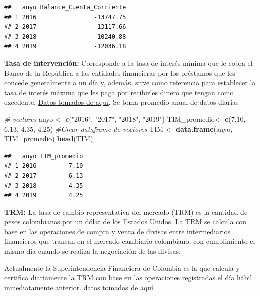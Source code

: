 \documentclass[
  11pt,
  a4paper,
]{book}
\newenvironment{Shaded}{\begin{snugshade}}{\end{snugshade}}
\newcommand{\CommentTok}[1]{\textcolor[rgb]{0.56,0.35,0.01}{\textit{#1}}}
\newcommand{\FloatTok}[1]{\textcolor[rgb]{0.00,0.00,0.81}{#1}}
\newcommand{\KeywordTok}[1]{\textcolor[rgb]{0.13,0.29,0.53}{\textbf{#1}}}
\newcommand{\NormalTok}[1]{#1}
\newcommand{\StringTok}[1]{\textcolor[rgb]{0.31,0.60,0.02}{#1}}
\begin{document}
\begin{verbatim}
##   anyo Balance_Cuenta_Corriente
## 1 2016                -13747.75
## 2 2017                -13117.66
## 3 2018                -10240.88
## 4 2019                -12036.18
\end{verbatim}

\textbf{Tasa de intervención:} Corresponde a la tasa de interés mínima
que le cobra el Banco de la República a las entidades financieras por
los préstamos que les concede generalmente a un día y, además, sirve
como referencia para establecer la tasa de interés máxima que les paga
por recibirles dinero que tengan como excedente.
\href{https://www.banrep.gov.co/es/estadisticas/tasas-interes-politica-monetaria}{Datos
tomados de aquí}. Se toma promedio anual de datos diarias

\begin{Shaded}
\begin{Highlighting}[]
\CommentTok{# vectores }
\NormalTok{anyo <-}\StringTok{ }\KeywordTok{c}\NormalTok{(}\StringTok{"2016"}\NormalTok{, }\StringTok{"2017"}\NormalTok{, }\StringTok{"2018"}\NormalTok{, }\StringTok{"2019"}\NormalTok{)}
\NormalTok{TIM_promedio<-}\StringTok{ }\KeywordTok{c}\NormalTok{(}\FloatTok{7.10}\NormalTok{, }\FloatTok{6.13}\NormalTok{, }\FloatTok{4.35}\NormalTok{, }\FloatTok{4.25}\NormalTok{)}
\CommentTok{#Crear dataframe de vectores}
\NormalTok{TIM <-}\StringTok{ }\KeywordTok{data.frame}\NormalTok{(anyo, TIM_promedio)}
\KeywordTok{head}\NormalTok{(TIM)}
\end{Highlighting}
\end{Shaded}

\begin{verbatim}
##   anyo TIM_promedio
## 1 2016         7.10
## 2 2017         6.13
## 3 2018         4.35
## 4 2019         4.25
\end{verbatim}

\textbf{TRM:} La tasa de cambio representativa del mercado (TRM) es la
cantidad de pesos colombianos por un dólar de los Estados Unidos. La TRM
se calcula con base en las operaciones de compra y venta de divisas
entre intermediarios financieros que transan en el mercado cambiario
colombiano, con cumplimiento el mismo día cuando se realiza la
negociación de las divisas.

Actualmente la Superintendencia Financiera de Colombia es la que calcula
y certifica diariamente la TRM con base en las operaciones registradas
el día hábil inmediatamente anterior.
\href{https://www.dolar-colombia.com/historico}{datos tomados de aquí}
\end{document}
